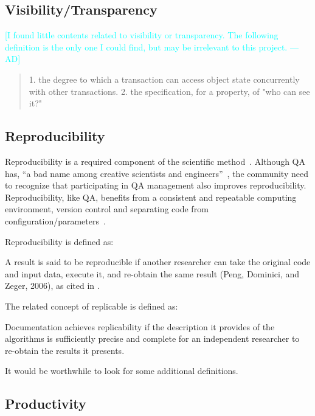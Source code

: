 \documentclass[letterpaper,cleveref]{lipics-v2019}
\newcommand{\authornote}[3]{\textcolor{#1}{[#3 ---#2]}}
\newcommand{\authornote}[3]{}
\newcommand{\ad}[1]{\authornote{cyan}{AD}{#1}} %
\theoremstyle{definition}
\begin{document}
\subsection{Visibility/Transparency}
    \ad{I found little contents related to visibility or transparency. The following definition is the only one I could find, but may be irrelevant to this project.}
    \begin{quotation}
        1. the degree to which a transaction can access object state concurrently with other transactions. 2. the specification, for a property, of "who can see it?"~\cite{ISO/IEC/IEEE24765}
    \end{quotation}
    
\subsection{Reproducibility}

Reproducibility is a required component of the scientific
method~\cite{Davison2012}.  Although QA has, ``a bad name among creative
scientists and engineers''~\cite[p.~352]{Roache1998}, the community need to
recognize that participating in QA management also improves reproducibility.
Reproducibility, like QA, benefits from a consistent and repeatable computing
environment, version control and separating code from
configuration/parameters~\cite{Davison2012}.

Reproducibility is defined as:

A result is said to be reproducible if another researcher can take the original
code and input data, execute it, and re-obtain the same result (Peng, Dominici,
and Zeger, 2006), as cited in \citet{BenureauAndRougier2017}.

The related concept of replicable is defined as:

Documentation achieves replicability if the description it provides of the
algorithms is sufficiently precise and complete for an independent researcher to
re-obtain the results it presents.  \citep{BenureauAndRougier2017}

It would be worthwhile to look for some additional definitions.

\subsection{Productivity}
\end{document}

